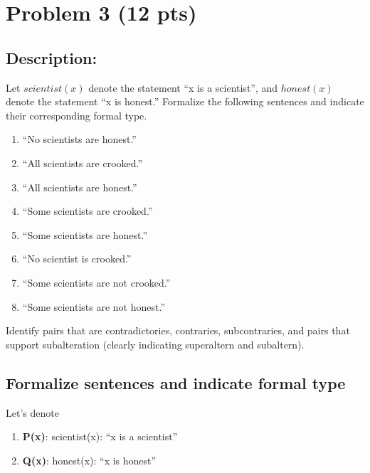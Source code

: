 \newpage

\section{Problem 3 (12 pts)}

\subsection{Description:}

\noindent Let $scientist(x)$ denote the statement ``x is a scientist'', and $honest(x)$ denote the statement ``x is honest.'' Formalize the following sentences and indicate their corresponding formal type.

\begin{enumerate}
\item ``No scientists are honest.''

\item ``All scientists are crooked.''

\item ``All scientists are honest.''

\item ``Some scientists are crooked.''

\item ``Some scientists are honest.''

\item ``No scientist is crooked.''

\item ``Some scientists are not crooked.''

\item ``Some scientists are not honest.''

\end{enumerate}

\noindent Identify pairs that are contradictories, contraries, subcontraries, and pairs that support subalteration (clearly indicating superaltern and subaltern).\\


\subsection{Formalize sentences and indicate formal type}

Let's denote
\begin{enumerate}
    \item[]\textbf{P(x)}: scientist(x): ``x is a scientist''
    \item[]\textbf{Q(x)}: honest(x): ``x is honest''
\end{enumerate}

